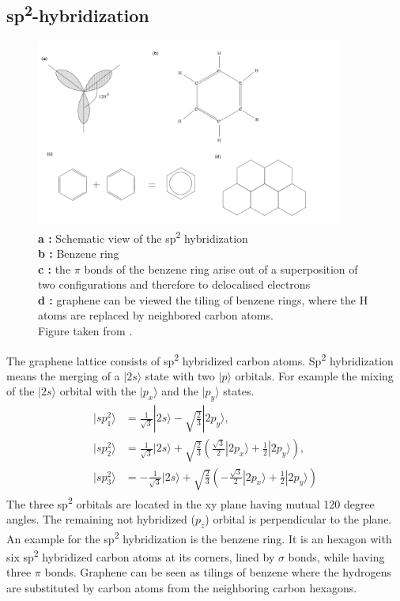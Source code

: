 		\subsection{sp\textsuperscript{2}-hybridization}
			\label{sec:sp2hybridisation}
			\begin{figure}[h]
				\centering
				\includegraphics[width=0.9\textwidth]{figures/Carbon/carbonHybridization2.png}
				\caption{\textbf{a :} Schematic view of the sp\textsuperscript{2} hybridization \\
				\textbf{b :} Benzene ring \\
				\textbf{c :} the $\pi$ bonds of the benzene ring arise out of a superposition of two configurations and therefore to delocalised electrons \\
				\textbf{d :} graphene can be viewed the tiling of benzene rings, where the H atoms are replaced by neighbored carbon atoms.\\
				Figure taken from \cite{grapheneIntroduction}.}
				\label{fig:carbonHybridization2}
			\end{figure}	
			The graphene lattice consists of sp\textsuperscript{2} hybridized carbon atoms. Sp\textsuperscript{2} hybridization means the merging of a $| 2s \rangle$ state with two $| p \rangle$ orbitals. For example the mixing of the $| 2s  \rangle$ orbital with the $| p_x \rangle$ and the $|p_y \rangle$ states.
			\begin{align}
				| sp_1^2 \rangle &= \tfrac{1}{\sqrt{3}} | 2s \rangle - \sqrt{\tfrac{2}{3}} | 2p_y \rangle, \\
				| sp_2^2 \rangle &= \tfrac{1}{\sqrt{3}} | 2s \rangle + \sqrt{\tfrac{2}{3}} (\tfrac{\sqrt{3}}{2} |2 p_x \rangle + \tfrac{1}{2} | 2p_y \rangle), \\
				|sp_3^2 \rangle &= - \tfrac{1}{\sqrt{3}} | 2s \rangle + \sqrt{\tfrac{2}{3}} ( - \tfrac{\sqrt{3}}{2} | 2p_x \rangle + \tfrac{1}{2} | 2 p_y \rangle)
			\end{align}
			The three sp\textsuperscript{2} orbitals are located in the xy plane having mutual 120 degree angles. The remaining not hybridized ($p_z$) orbital is perpendicular to the plane. An example for the sp\textsuperscript{2} hybridization is the benzene ring. It is an hexagon with six sp\textsuperscript{2} hybridized carbon atoms at its corners, lined by $\sigma$ bonds, while having three $\pi$ bonds. Graphene can be seen as tilings of benzene where the hydrogens are substituted by carbon atoms from the neighboring carbon hexagons.		

